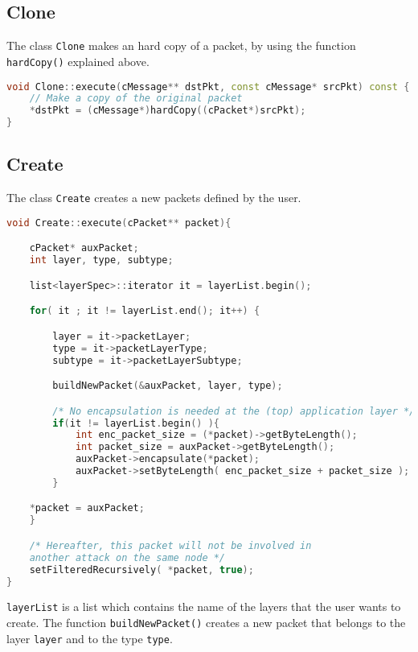 \subsection{Clone}
The class \texttt{Clone} makes an hard copy of a packet, by using the function \texttt{hardCopy()} explained above.
%
\begin{lstlisting}[language={cpp}]
void Clone::execute(cMessage** dstPkt, const cMessage* srcPkt) const {
	// Make a copy of the original packet
	*dstPkt = (cMessage*)hardCopy((cPacket*)srcPkt);
}
\end{lstlisting}


\subsection{Create}
The class \texttt{Create} creates a new packets defined by the user. 
\iffalse
This complex code but it is the cause that makes the tool dependent by the changing. As you'll see further there is a section that speaks about how to update the tool. The code responsible of this is in the \texttt{buildNewPacket()}, in fact that function is the one that creates the packet and will be explained in the \ref{sec:updateCastalia}. 
\fi
%
\begin{lstlisting}[language={cpp}]
void Create::execute(cPacket** packet){

	cPacket* auxPacket;
	int layer, type, subtype;

	list<layerSpec>::iterator it = layerList.begin();

	for( it ; it != layerList.end(); it++) {

		layer = it->packetLayer;
		type = it->packetLayerType;
		subtype = it->packetLayerSubtype;

		buildNewPacket(&auxPacket, layer, type);

		/* No encapsulation is needed at the (top) application layer */
		if(it != layerList.begin() ){
			int enc_packet_size = (*packet)->getByteLength();
			int packet_size = auxPacket->getByteLength();
			auxPacket->encapsulate(*packet);
			auxPacket->setByteLength( enc_packet_size + packet_size );
		}  

	*packet = auxPacket;
	}

	/* Hereafter, this packet will not be involved in 
	another attack on the same node */
	setFilteredRecursively( *packet, true);
}
\end{lstlisting}
%
\texttt{layerList} is a list which contains the name of the layers that the user wants to create. The function \texttt{buildNewPacket()} creates a new packet that belongs to the layer \texttt{layer} and to the type \texttt{type}. %


